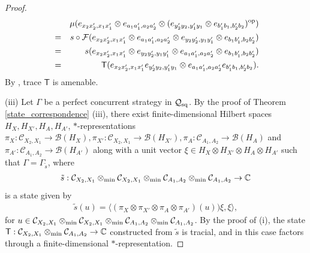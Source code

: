 \documentclass[11pt]{amsart}
\newcommand{\cl}[1]{\mathcal{#1}}
\newcommand{\bb}[1]{\mathbb{#1}}
\begin{document}
\begin{proof}
\begin{eqnarray*}
& &
	\mu(e_{x_{2}x_{2}', x_{1}x_{1}'}\otimes e_{a_{1}a_{1}', a_{2}a_{2}'}\otimes (e_{y_{2}'y_{2}, y_{1}'y_{1}}\otimes e_{b_{1}'b_{1}, b_{2}'b_{2}})^{\rm op}) \\
& = &
	s\circ \cl{F}(e_{x_{2}x_{2}', x_{1}x_{1}'}\otimes e_{a_{1}a_{1}', a_{2}a_{2}'}\otimes e_{y_{2}y_{2}', y_{1}y_{1}'}\otimes e_{b_{1}b_{1}', b_{2}b_{2}'}) \\
& = &
	s(e_{x_{2}x_{2}', x_{1}x_{1}'}\otimes e_{y_{2}y_{2}', y_{1}y_{1}'}\otimes e_{a_{1}a_{1}', a_{2}a_{2}'}\otimes e_{b_{1}b_{1}', b_{2}b_{2}'}) \\
& = &
	\mathsf{T}(e_{x_{2}x_{2}', x_{1}x_{1}'}e_{y_{2}'y_{2}, y_{1}'y_{1}}\otimes e_{a_{1}a_{1}', a_{2}a_{2}'}e_{b_{1}'b_{1}, b_{2}'b_{2}}).
\end{eqnarray*}
\noindent By \cite[Theorem 6.2.7]{bo}, trace $\mathsf{T}$ is amenable.  

(iii) Let $\Gamma$ be a perfect concurrent strategy in $\cl{Q}_{\rm sq}$. By the proof of Theorem \ref{state_correspondence} (iii), there exist finite-dimensional Hilbert spaces $H_{X}, H_{X'}, H_{A}, H_{A'}$, $*$-representations $\pi_{X}: \cl{C}_{X_{2}, X_{1}}\rightarrow \cl{B}(H_{X}), \pi_{X'}: \cl{C}_{X_{2}, X_{1}}\rightarrow \cl{B}(H_{X'}), \pi_{A}: \cl{C}_{A_{1}, A_{2}}\rightarrow \cl{B}(H_{A})$ and $\pi_{A'}: \cl{C}_{A_{1}, A_{2}}\rightarrow \cl{B}(H_{A'})$ along with a unit vector $\xi \in H_{X}\otimes H_{X'}\otimes H_{A}\otimes H_{A'}$ such that $\Gamma = \Gamma_{\tilde{s}}$, where 
\begin{gather*}
	\tilde{s}: \cl{C}_{X_{2}, X_{1}}\otimes_{\rm min} \cl{C}_{X_{2}, X_{1}}\otimes_{\rm min} \cl{C}_{A_{1}, A_{2}}\otimes_{\rm min} \cl{C}_{A_{1}, A_{2}}\rightarrow \bb{C}
\end{gather*}
\noindent is a state given by
\begin{gather}\label{q_concurrent_state_eqn}
	\tilde{s}(u) = \langle (\pi_{X}\otimes \pi_{X'}\otimes \pi_{A}\otimes \pi_{A'})(u))\xi, \xi\rangle,
\end{gather}
\noindent for $u \in \cl{C}_{X_{2}, X_{1}}\otimes_{\rm min}\cl{C}_{X_{2}, X_{1}}\otimes_{\rm min} \cl{C}_{A_{1}, A_{2}}\otimes_{\rm min} \cl{C}_{A_{1}, A_{2}}$. By the proof of (i), the state $\mathsf{T}: \cl{C}_{X_{2}, X_{1}}\otimes_{\rm min} \cl{C}_{A_{1}, A_{2}} \rightarrow \bb{C}$ constructed from $\tilde{s}$ is tracial, and in this case factors through a finite-dimensional $*$-representation. 


\end{proof}
\end{document}
